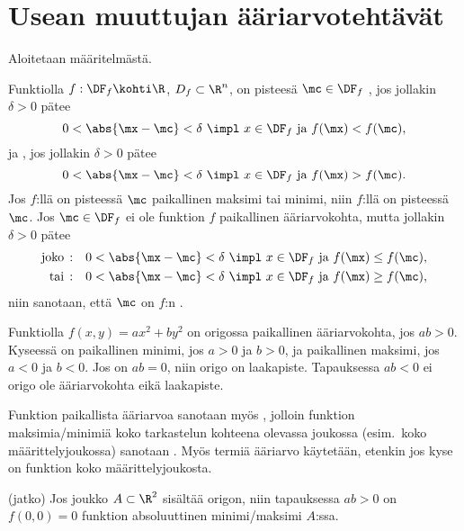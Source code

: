 \section{Usean muuttujan ääriarvotehtävät} \label{usean muuttujan ääriarvotehtävät}
\alku
{}

Aloitetaan määritelmästä.
\begin{Def} \label{usean muuttujan ääriarvot}
Funktiolla $f:\DF_f\kohti\R$, $D_f\subset\R^n$, on pisteesä $\mc\in\DF_f$
, jos jollakin $\delta>0$ pätee
\[
0<\abs{\mx-\mc}<\delta \ \impl \ x\in\DF_f \text{ ja } f(\mx)<f(\mc),
\]
ja , jos jollakin $\delta>0$ pätee
\[
0<\abs{\mx-\mc}<\delta \ \impl \ x\in\DF_f \text{ ja } f(\mx)>f(\mc).
\]
Jos $f$:llä on pisteessä $\mc$ paikallinen maksimi tai minimi, niin $f$:llä on 
 pisteessä $\mc$. Jos $\mc\in\DF_f$ ei ole funktion $f$ paikallinen
ääriarvokohta, mutta jollakin $\delta>0$ pätee
\begin{align*}
\text{joko}\,:\quad &0<\abs{\mx-\mc}<\delta\ \impl \ x\in\DF_f \text{ ja } f(\mx) \le f(\mc),\\
\text{tai}\,: \quad &0<\abs{\mx-\mc}<\delta\ \impl \ x\in\DF_f \text{ ja } f(\mx) \ge f(\mc),
\end{align*}
niin sanotaan, että $\mc$ on $f$:n .
\end{Def}
\begin{Exa} \label{udif-8.1} Funktiolla $f(x,y)=ax^2+by^2$ on origossa paikallinen
ääriarvokohta, jos $ab>0$. Kyseessä on paikallinen minimi, jos $a>0$ ja $b>0$, ja paikallinen
maksimi, jos $a<0$ ja $b<0$. Jos on $ab=0$, niin origo on laakapiste. Tapauksessa $ab<0$ ei
origo ole ääriarvokohta eikä laakapiste. \loppu
\end{Exa}
Funktion paikallista ääriarvoa sanotaan myös
%
, jolloin funktion maksimia/minimiä koko tarkastelun kohteena olevassa
joukossa (esim.\ koko määrittelyjoukossa) sanotaan
 
. Myös termiä  ääriarvo käytetään, etenkin jos kyse on 
funktion koko määrittelyjoukosta.
\jatko \begin{Exa} (jatko) Jos joukko $A \subset \R^2$ sisältää origon, niin tapauksessa $ab>0$
on $f(0,0)=0$ funktion absoluuttinen minimi/maksimi $A$:ssa. \loppu
\end{Exa}  

